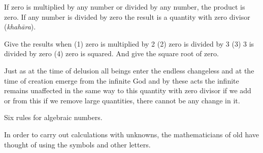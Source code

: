 \documentclass[]{article}
\begin{document}
{{\newpage
\large

If zero is multiplied by any number or divided by any number, the
product is zero. If any number is divided by zero the result is a
quantity with zero divisor (\textit{khahāra}).

\begin{quote}  {
}  \end{quote}

Give the results when (1) zero is multiplied by 2 (2) zero is divided
by 3 (3) 3 is divided by zero (4) zero is squared. And give the square
root of zero.

\begin{quote}  {
}  \end{quote}

Just as at the time of delusion all beings enter the endless changeless
and at the time of creation emerge from the infinite God and by these
acts the infinite remains unaffected in the same way to this quantity
with zero divisor if we add or from this if we remove large quantities,
there cannot be any change in it.
\vspace{20pt}
\begin{center}
\begin{Large}
 \label{var}
{}
\end{Large}
\end{center}
\vspace{10pt}
{Six rules for algebraic numbers.}

\begin{quote}  {
}  \end{quote}

{In order to carry out calculations with unknowns, the mathematicians of
old have thought of using the symbols {} and other letters.}

}}
\end{document}
